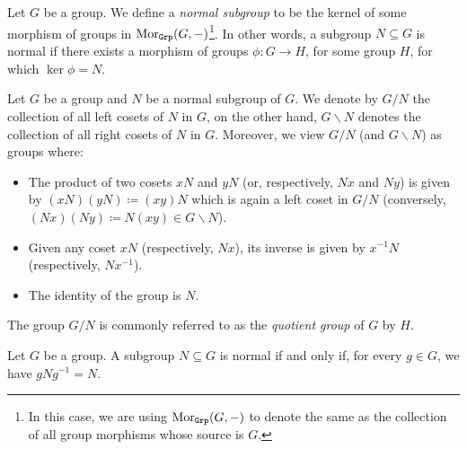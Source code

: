 \begin{definition}
\label{def:normal-subgroup}
Let \(G\) be a group. We define a \emph{normal subgroup} to be the kernel of
some morphism of groups in \(\operatorname{Mor}_{{\texttt{Grp}}}(G, -)\)\footnote{In this case, we are
using \(\operatorname{Mor}_{{\texttt{Grp}}}(G, -)\) to denote the same as the collection of all group
morphisms whose source is \(G\).}. In other words, a subgroup \(N \subseteq G\)
is normal if there exists a morphism of groups \(\phi: G \to H\), for some group
\(H\), for which \(\ker \phi = N\).
\end{definition}

\begin{definition}
\label{def:quotient-group}
Let \(G\) be a group and \(N\) be a normal subgroup of \(G\). We denote by
\(G/N\) the collection of all left cosets of \(N\) in \(G\), on the other hand,
\(G \backslash N\) denotes the collection of all right cosets of \(N\) in
\(G\). Moreover, we view \(G/N\) (and \(G \backslash N\)) as groups where:
\begin{itemize}\setlength\itemsep{0em}
\item The product of two cosets \(x N\) and \(y N\) (or, respectively, \(N
  x\) and \(N y\)) is given by \((x N) (y N) \coloneq (x y) N\) which is again a
  left coset in \(G/N\) (conversely, \((N x) (N y) \coloneq N (x y) \in G
  \backslash N\)).
\item Given any coset \(x N\) (respectively, \(N x\)), its inverse is given by
  \(x^{-1} N\) (respectively, \(N x^{-1}\)).
\item The identity of the group is \(N\).
\end{itemize}
The group \(G/N\) is commonly referred to as the \emph{quotient group} of \(G\)
by \(H\).
\end{definition}

\begin{proposition}
\label{prop:normal-subgroup-equivalence}
Let \(G\) be a group. A subgroup \(N \subseteq G\) is normal if and only if, for
every \(g \in G\), we have \(gNg^{-1} = N\).
\end{proposition}

